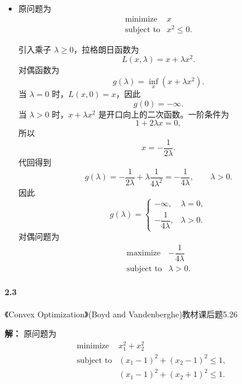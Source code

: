 \documentclass[12pt,a4paper]{article}
\begin{document}
\begin{itemize}
  \item[(3)] 原问题为
  \[
    \begin{array}{ll}
      \text{minimize} & x\\
      \text{subject to} & x^2\leq0.
    \end{array}
  \]
 
 
 
 

  引入乘子 $\lambda\geq0$，拉格朗日函数为
  \[
    L(x,\lambda)=x+\lambda x^2.
  \]
  对偶函数为
  \[
    g(\lambda)=\inf_x(x+\lambda x^2).
  \]
  当 $\lambda=0$ 时，$L(x,0)=x$，因此
  \[
    g(0)=-\infty.
  \]
  当 $\lambda>0$ 时，$x+\lambda x^2$ 是开口向上的二次函数。一阶条件为
  \[
    1+2\lambda x=0,
  \]
  所以
  \[
    x=-\frac{1}{2\lambda}.
  \]
  代回得到
  \[
    g(\lambda)
    =-\frac{1}{2\lambda}
    +\lambda\frac{1}{4\lambda^2}
    =-\frac{1}{4\lambda},
    \qquad \lambda>0.
  \]
  因此
  \[
    g(\lambda)=
    \begin{cases}
      -\infty, & \lambda=0,\\[0.3em]
      -\dfrac{1}{4\lambda}, & \lambda>0.
    \end{cases}
  \]
  对偶问题为
  \[
    \boxed{
    \begin{array}{ll}
      \text{maximize} & -\dfrac{1}{4\lambda}\\[0.5em]
      \text{subject to} & \lambda>0.
    \end{array}}
  \]
\end{itemize}



\paragraph{2.3} 《Convex Optimization》(Boyd and Vandenberghe)教材课后题5.26

\textbf{解：}
原问题为
\[
\begin{array}{ll}
  \text{minimize} & x_1^2+x_2^2\\
  \text{subject to} &
  (x_1-1)^2+(x_2-1)^2\leq1,\\
  & (x_1-1)^2+(x_2+1)^2\leq1.
\end{array}
\]
\end{document}
